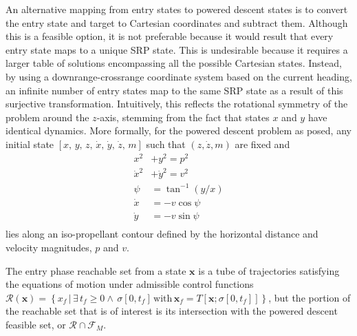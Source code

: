 \documentclass[letterpaper, preprint, paper,11pt]{AAS}
\begin{document}
An alternative mapping from entry states to powered descent states is to convert the entry state and target to Cartesian coordinates and subtract them. Although this is a feasible option, it is not preferable because it would result that every entry state maps to a unique SRP state. This is undesirable because it requires a larger table of solutions encompassing all the possible Cartesian states. Instead, by using a downrange-crossrange coordinate system based on the current heading, an infinite number of entry states map to the same SRP state as a result of this surjective transformation. Intuitively, this reflects the rotational symmetry of the problem around the $z$-axis, stemming from the fact that states $ x $ and $ y $ have identical dynamics. More formally, for the powered descent problem as posed, any initial state $[ x,\, y,\, z,\, \dot{x},\, \dot{y},\, \dot{z},\, m]$ such that $(z, \dot{z}, m)$ are fixed and 
\begin{align}
x^2 &+ y^2 = p^2 \\
\dot{x}^2 &+ \dot{y}^2 = v^2 \\
\psi &= \tan^{-1}(y/x) \\
\dot{x} &= -v\cos\psi \\
\dot{y} &= -v\sin\psi \\
\end{align}
lies along an iso-propellant contour defined by the horizontal distance and velocity magnitudes, $p$ and $v$.



The entry phase reachable set from a state $ \mathbf{x} $ is a tube of trajectories satisfying the equations of motion under admissible control functions $\mathcal{R}(\mathbf{x})=\left\{x_f \,| \,\exists\, t_f \ge 0 \land\, \sigma[0,t_f] \,\mathrm{with}\, \mathbf{x}_f = T[\mathbf{x}; \sigma[0,t_f]]  \right\}$, but the portion of the reachable set that is of interest is its intersection with the powered descent feasible set, or $\mathcal{R} \cap \mathcal{F}_M$.
\end{document}

